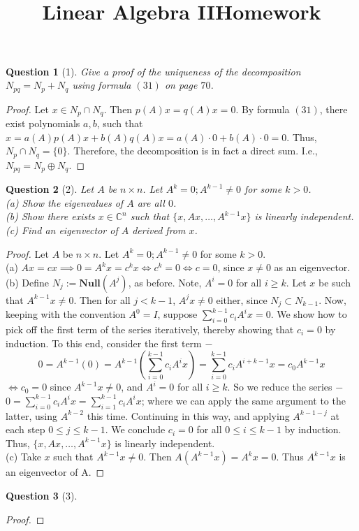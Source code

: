 \documentclass[11pt]{article}
\title{\vspace{-50pt}
\Huge \name
\\\vspace{20pt}
\huge Linear Algebra II\hfill Homework \hw}
\author{}
\date{}
\theoremstyle{quest}
\newtheorem*{question}{Question}
\begin{document}
\maketitle

\begin{question}[1]
Give a proof of the uniqueness of the decomposition $N_{pq} = N_p + N_q$ using formula $(31)$ on page $70$.
\end{question}
\begin{proof}
Let $x \in N_p \cap N_q$. Then $p(A)x = q(A)x = 0$. By formula $(31)$, there exist polynomials $a, b$, such that $x = a(A)p(A)x + b(A)q(A)x = a(A) \cdot 0 + b(A) \cdot 0 = 0$. Thus, $N_p \cap N_q = \{0\}$. Therefore, the decomposition is in fact a direct sum. I.e., $N_{pq} = N_p \oplus N_q$.
\end{proof}
\begin{question}[2]
Let $A$ be $n \times n$. Let $A^k = 0; A^{k-1} \ne 0$ for some $k > 0$.
\\(a) Show the eigenvalues of $A$ are all $0$.
\\(b) Show there exists $x \in \mathbb{C}^n$ such that $\{x, Ax, \ldots, A^{k-1}x\}$ is linearly independent.
\\(c) Find an eigenvector of $A$ derived from $x$.
\end{question}
\begin{proof}
Let $A$ be $n \times n$. Let $A^k = 0; A^{k-1} \ne 0$ for some $k > 0$.
\\(a) $Ax = cx \implies 0 = A^k x = c^k x \iff c^k = 0 \iff c = 0$, since $x \ne 0$ as an eigenvector.
\\ (b) Define $N_j := \mathbf{Null}(A^j)$, as before. Note, $A^i = 0$ for all $i \ge k$. Let $x$ be such that $A^{k-1}x \ne 0$. Then for all $j < k-1$, $A^j x \ne 0$ either, since $N_j \subset N_{k-1}$. Now, keeping with the convention $A^0 = I$, suppose $\sum_{i = 0}^{k-1} c_i A^i x = 0$. We show how to pick off the first term of the series iteratively, thereby showing that $c_i = 0$ by induction. To this end, consider the first term $-$
$$0 = A^{k-1}(0) = A^{k-1}(\sum_{i = 0}^{k-1} c_i A^i x) = \sum_{i = 0}^{k-1} c_i A^{i+k-1} x = c_0 A^{k-1} x$$
$\iff c_0 = 0$ since $A^{k-1}x \ne 0$, and $A^i = 0$ for all $i \ge k$. So we reduce the series $-$ $0 = \sum_{i = 0}^{k-1} c_i A^i x = \sum_{i = 1}^{k-1} c_i A^i x$; where we can apply the same argument to the latter, using $A^{k-2}$ this time. Continuing in this way, and applying $A^{k-1-j}$ at each step $ 0 \le j \le k-1$. We conclude $c_i = 0$ for all $ 0 \le i \le k-1$ by induction. Thus, $\{x, Ax, \ldots, A^{k-1}x\}$ is linearly independent.
\\(c) Take $x$ such that $A^{k-1} x \ne 0$. Then $A(A^{k-1} x) = A^k x = 0$. Thus $A^{k-1} x$ is an eigenvector of A.
\end{proof}
\begin{question}[3]

\end{question}
\begin{proof}

\end{proof}
\end{document}
